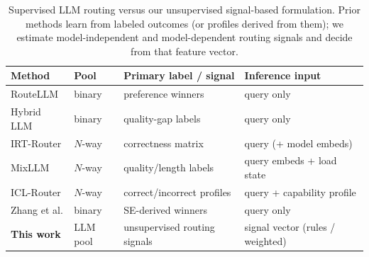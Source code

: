 \begin{table}[t]
\centering
\small
\begin{tabular}{p{2.4cm}p{2.6cm}p{2.4cm}p{2.8cm}}
\toprule
\textbf{Method} & \textbf{Pool} & \textbf{Primary label / signal} & \textbf{Inference input} \\
\midrule
RouteLLM & binary & preference winners & query only \\
Hybrid LLM & binary & quality-gap labels & query only \\
IRT-Router & $N$-way & correctness matrix & query (+ model embeds) \\
MixLLM & $N$-way & quality/length labels & query embeds + load state \\
ICL-Router & $N$-way & correct/incorrect profiles & query + capability profile \\
Zhang et al. & binary & SE-derived winners & query only \\
\midrule
\textbf{This work} & LLM pool & unsupervised routing signals & signal vector (rules / weighted) \\
\bottomrule
\end{tabular}
\caption{Supervised LLM routing versus our unsupervised signal-based formulation.
Prior methods learn from labeled outcomes (or profiles derived from them); we estimate model-independent and model-dependent routing signals and decide from that feature vector.
}
\label{tab:related-contrast}
\end{table}
